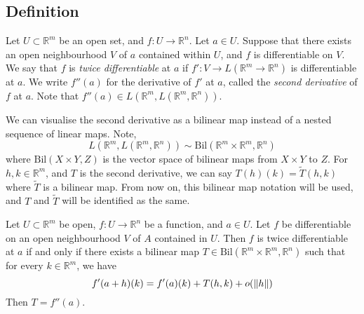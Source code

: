 \subsection{Definition}
\begin{definition}
	Let \( U \subset \mathbb R^m \) be an open set, and \( f \colon U \to \mathbb R^n \).
	Let \( a \in U \).
	Suppose that there exists an open neighbourhood \( V \) of \( a \) contained within \( U \), and \( f \) is differentiable on \( V \).
	We say that \( f \) is \textit{twice differentiable} at \( a \) if \( f' \colon V \to L(\mathbb R^m \to \mathbb R^n) \) is differentiable at \( a \).
	We write \( f''(a) \) for the derivative of \( f' \) at \( a \), called the \textit{second derivative} of \( f \) at \( a \).
	Note that \( f''(a) \in L(\mathbb R^m, L(\mathbb R^m, \mathbb R^n)) \).
\end{definition}
\begin{remark}
	We can visualise the second derivative as a bilinear map instead of a nested sequence of linear maps.
	Note,
	\[
		L(\mathbb R^m, L(\mathbb R^m, \mathbb R^n)) \sim \mathrm{Bil}(\mathbb R^m \times \mathbb R^m, \mathbb R^n)
	\]
	where \( \mathrm{Bil}(X \times Y, Z) \) is the vector space of bilinear maps from \( X \times Y \) to \( Z \).
	For \( h, k \in \mathbb R^m \), and \( T \) is the second derivative, we can say \( T(h)(k) = \widetilde T(h,k) \) where \( \widetilde T \) is a bilinear map.
	From now on, this bilinear map notation will be used, and \( T \) and \( \widetilde T \) will be identified as the same.
\end{remark}
\begin{proposition}
	Let \( U \subset \mathbb R^m \) be open, \( f \colon U \to \mathbb R^n \) be a function, and \( a \in U \).
	Let \( f \) be differentiable on an open neighbourhood \( V \) of \( A \) contained in \( U \).
	Then \( f \) is twice differentiable at \( a \) if and only if there exists a bilinear map \( T \in \mathrm{Bil}(\mathbb R^m \times \mathbb R^m, \mathbb R^n) \) such that for every \( k \in \mathbb R^m \), we have
	\[
		f'(a+h)(k) = f'(a)(k) + T(h,k) + o(\norm{h})
	\]
	Then \( T = f''(a) \).
\end{proposition}
